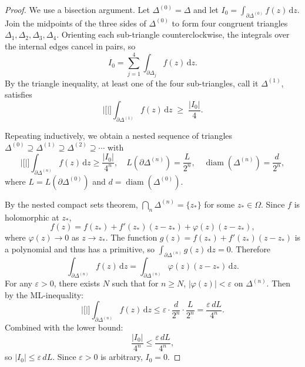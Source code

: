 \documentclass[12pt,a4paper,openany]{book}
\theoremstyle{definition}
\theoremstyle{plain}
\theoremstyle{remark}
\newcommand{\dd}{\mathrm{d}}
\newcommand{\abs}[1]{\left|#1\right|}
\DeclareMathOperator{\diam}{diam}
\begin{document}
\begin{proof}
We use a bisection argument.  Let $\Delta^{(0)} = \Delta$ and let
$I_0 = \int_{\partial\Delta^{(0)}}f(z)\,\dd z$.  Join the midpoints of the
three sides of $\Delta^{(0)}$ to form four congruent triangles
$\Delta_1,\Delta_2,\Delta_3,\Delta_4$.  Orienting each sub-triangle
counterclockwise, the integrals over the internal edges cancel in pairs, so
\[
  I_0 = \sum_{j=1}^{4}\int_{\partial\Delta_j}f(z)\,\dd z.
\]
By the triangle inequality, at least one of the four sub-triangles, call it
$\Delta^{(1)}$, satisfies
\[
  \abs[\bigg]{\int_{\partial\Delta^{(1)}}f(z)\,\dd z} \;\ge\; \frac{\abs{I_0}}{4}.
\]

\begin{center}
\label{fig:goursat-bisection}
\end{center}

Repeating inductively, we obtain a nested sequence of triangles
$\Delta^{(0)}\supseteq\Delta^{(1)}\supseteq\Delta^{(2)}\supseteq\cdots$ with
\[
  \abs[\bigg]{\int_{\partial\Delta^{(n)}}f(z)\,\dd z} \ge \frac{\abs{I_0}}{4^n},
  \quad
  L(\partial\Delta^{(n)}) = \frac{L}{2^n},
  \quad
  \diam(\Delta^{(n)}) = \frac{d}{2^n},
\]
where $L = L(\partial\Delta^{(0)})$ and $d = \diam(\Delta^{(0)})$.

By the nested compact sets theorem, $\bigcap_n\Delta^{(n)} = \{z_*\}$ for
some $z_*\in\Omega$.  Since $f$ is holomorphic at $z_*$,
\[
  f(z) = f(z_*) + f'(z_*)(z-z_*) + \varphi(z)(z-z_*),
\]
where $\varphi(z)\to 0$ as $z\to z_*$.  The function $g(z)=f(z_*)+f'(z_*)(z-z_*)$
is a polynomial and thus has a primitive, so
$\int_{\partial\Delta^{(n)}}g(z)\,\dd z=0$.  Therefore
\[
  \int_{\partial\Delta^{(n)}}f(z)\,\dd z
  = \int_{\partial\Delta^{(n)}}\varphi(z)(z-z_*)\,\dd z.
\]
For any $\varepsilon>0$, there exists $N$ such that for $n\ge N$,
$\abs{\varphi(z)}<\varepsilon$ on $\Delta^{(n)}$.
Then by the ML-inequality:
\[
  \abs[\bigg]{\int_{\partial\Delta^{(n)}}f(z)\,\dd z}
  \le \varepsilon\cdot\frac{d}{2^n}\cdot\frac{L}{2^n}
  = \frac{\varepsilon\,dL}{4^n}.
\]
Combined with the lower bound:
\[
  \frac{\abs{I_0}}{4^n}
  \le \frac{\varepsilon\,dL}{4^n},
\]
so $\abs{I_0}\le\varepsilon\,dL$.  Since $\varepsilon>0$ is arbitrary,
$I_0 = 0$.
\end{proof}
\end{document}

